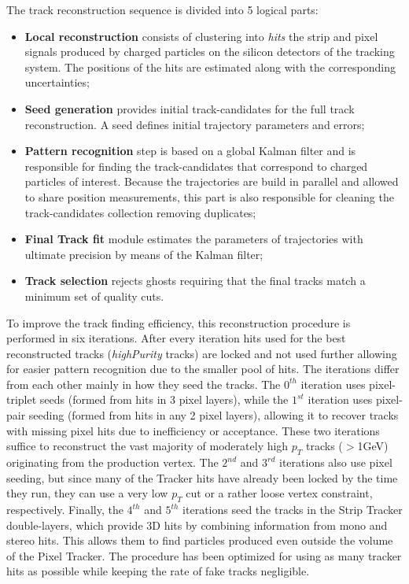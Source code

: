 The track reconstruction sequence is divided into 5 logical parts:
\begin{itemize}
\item \textbf{Local reconstruction} consists of clustering into \textit{hits}
the strip and pixel signals produced by charged particles on the silicon
detectors of the tracking system. The positions of the hits are estimated along
with the corresponding uncertainties;
\item \textbf{Seed generation} provides initial track-candidates for the full
track reconstruction. A seed defines initial trajectory parameters and errors;
\item \textbf{Pattern recognition} step is based on a global Kalman filter and
is responsible for finding the track-candidates that correspond to charged
particles of interest. Because the trajectories are build in parallel and allowed to share position
measurements, this part is also responsible for
cleaning the track-candidates collection removing duplicates;
\item \textbf{Final Track fit} module estimates the parameters of trajectories
with ultimate precision by means of the Kalman filter;
\item \textbf{Track selection} rejects ghosts requiring that the final
tracks match a minimum set of quality cuts.
\end{itemize}

To improve the track finding efficiency, this reconstruction procedure is
performed in six iterations. After every iteration hits
used for the best reconstructed tracks (\textit{highPurity} tracks) are
locked and not used further allowing for easier pattern recognition due to
the smaller pool of hits. The iterations differ from each other mainly in how they
seed the tracks. The $0^{th}$ iteration uses pixel-triplet seeds (formed from
hits in 3 pixel layers), while the $1^{st}$ iteration uses pixel-pair seeding
(formed from hits in any 2 pixel layers), allowing it to recover tracks with
missing pixel hits due to inefficiency or acceptance. These two iterations
suffice to reconstruct the vast majority of moderately high $p_T$ tracks ($>$1GeV)
originating from the production vertex. The $2^{nd}$ and $3^{rd}$ iterations
also use pixel seeding, but since many of the Tracker hits have already been
locked by the time they run, they can use a very low $p_T$ cut or a rather
loose vertex constraint, respectively. Finally, the $4^{th}$ and $5^{th}$
iterations seed the tracks in the Strip Tracker double-layers, which provide 3D
hits by combining information from mono and stereo hits. This allows them to
find particles produced even outside the volume of the Pixel Tracker. The procedure has been optimized for using as
many tracker hits as possible while keeping the rate of fake tracks negligible.

